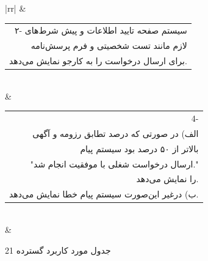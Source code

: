 \documentclass[12pt]{article}
\begin{document}
\begin{center}
\begin{table}[H]
\begin{tabular}{|rr|}
				                                           & \begin{tabular}[c]{@{}r@{}}۲- سیستم صفحه تایید اطلاعات و پیش شرط‌های\\  لازم مانند تست شخصیتی و فرم پرسش‌نامه\\  برای ارسال درخواست را به کارجو نمایش می‌دهد.\end{tabular}                                                                     \\ \hline
				 & \begin{tabular}[c]{@{}r@{}}4- \\ الف) در صورتی که درصد تطابق رزومه و آگهی\\  بالاتر از ۵۰ درصد بود سیستم پیام \\ "ارسال درخواست شغلی با موفقیت انجام شد." \\  را نمایش می‌دهد.\\ ب) درغیر این‌صورت سیستم پیام خطا نمایش می‌دهد.\end{tabular} \\ \hline
				                            &                                                                                                                                                                                                                          \\ \hline

			\end{tabular}
		\end{table}

		\begin{table}[ht]
			\caption{جدول مورد کاربرد گسترده 21}
			\label{tab:ext-uc21}
			\centering


\end{table}
\end{center}
\end{document}
